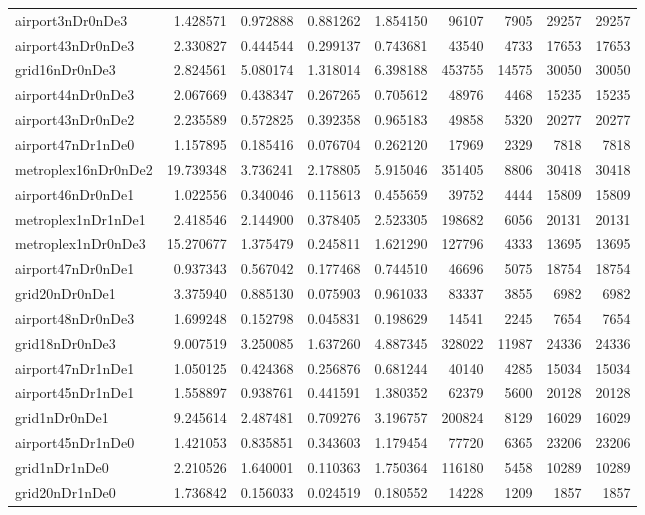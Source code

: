 \begin{longtable}{|l|r|r|r|r|r|r|r|r|}
airport3nDr0nDe3 & 1.428571 & 0.972888 & 0.881262 & 1.854150 & 96107 & 7905 & 29257 & 29257 \\
airport43nDr0nDe3 & 2.330827 & 0.444544 & 0.299137 & 0.743681 & 43540 & 4733 & 17653 & 17653 \\
grid16nDr0nDe3 & 2.824561 & 5.080174 & 1.318014 & 6.398188 & 453755 & 14575 & 30050 & 30050 \\
airport44nDr0nDe3 & 2.067669 & 0.438347 & 0.267265 & 0.705612 & 48976 & 4468 & 15235 & 15235 \\
airport43nDr0nDe2 & 2.235589 & 0.572825 & 0.392358 & 0.965183 & 49858 & 5320 & 20277 & 20277 \\
airport47nDr1nDe0 & 1.157895 & 0.185416 & 0.076704 & 0.262120 & 17969 & 2329 & 7818 & 7818 \\
metroplex16nDr0nDe2 & 19.739348 & 3.736241 & 2.178805 & 5.915046 & 351405 & 8806 & 30418 & 30418 \\
airport46nDr0nDe1 & 1.022556 & 0.340046 & 0.115613 & 0.455659 & 39752 & 4444 & 15809 & 15809 \\
metroplex1nDr1nDe1 & 2.418546 & 2.144900 & 0.378405 & 2.523305 & 198682 & 6056 & 20131 & 20131 \\
metroplex1nDr0nDe3 & 15.270677 & 1.375479 & 0.245811 & 1.621290 & 127796 & 4333 & 13695 & 13695 \\
airport47nDr0nDe1 & 0.937343 & 0.567042 & 0.177468 & 0.744510 & 46696 & 5075 & 18754 & 18754 \\
grid20nDr0nDe1 & 3.375940 & 0.885130 & 0.075903 & 0.961033 & 83337 & 3855 & 6982 & 6982 \\
airport48nDr0nDe3 & 1.699248 & 0.152798 & 0.045831 & 0.198629 & 14541 & 2245 & 7654 & 7654 \\
grid18nDr0nDe3 & 9.007519 & 3.250085 & 1.637260 & 4.887345 & 328022 & 11987 & 24336 & 24336 \\
airport47nDr1nDe1 & 1.050125 & 0.424368 & 0.256876 & 0.681244 & 40140 & 4285 & 15034 & 15034 \\
airport45nDr1nDe1 & 1.558897 & 0.938761 & 0.441591 & 1.380352 & 62379 & 5600 & 20128 & 20128 \\
grid1nDr0nDe1 & 9.245614 & 2.487481 & 0.709276 & 3.196757 & 200824 & 8129 & 16029 & 16029 \\
airport45nDr1nDe0 & 1.421053 & 0.835851 & 0.343603 & 1.179454 & 77720 & 6365 & 23206 & 23206 \\
grid1nDr1nDe0 & 2.210526 & 1.640001 & 0.110363 & 1.750364 & 116180 & 5458 & 10289 & 10289 \\
grid20nDr1nDe0 & 1.736842 & 0.156033 & 0.024519 & 0.180552 & 14228 & 1209 & 1857 & 1857 \\

\end{longtable}

